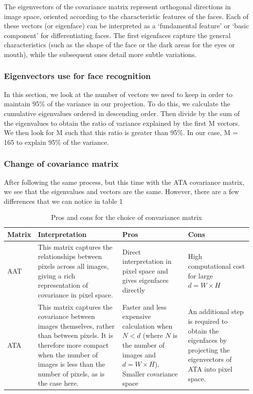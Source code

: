 The eigenvectors of the covariance matrix represent orthogonal directions in image space, oriented according to the characteristic features of the faces. Each of these vectors (or eigenface) can be interpreted as a ‘fundamental feature’ or ‘basic component’ for differentiating faces. The first eigenfaces capture the general characteristics (such as the shape of the face or the dark areas for the eyes or mouth), while the subsequent ones detail more subtle variations.

\subsubsection{Eigenvectors use for face recognition}

In this section, we look at the number of vectors we need to keep in order to maintain 95\% of the variance in our projection. To do this, we calculate the cumulative eigenvalues ordered in descending order. Then divide by the sum of the eigenvalues to obtain the ratio of variance explained by the first M vectors. We then look for M such that this ratio is greater than 95\%. In our case, M = 165 to explain 95\% of the variance.

\subsubsection{Change of covariance matrix}

After following the same process, but this time with the ATA covariance matrix, we see that the eigenvalues and vectors are the same. However, there are a few differences that we can notice in table 1


\begin{table}[ht]
	\centering
	\begin{tabular}{|l|p{7cm}|p{3cm}|p{3cm}|}
		\hline
		\textbf{Matrix} & \textbf{Interpretation} & \textbf{Pros} & \textbf{Cons} \\
		\hline
		AAT & This matrix captures the relationships between pixels across all images, giving a rich representation of covariance in pixel space. & Direct interpretation in pixel space and gives eigenfaces directly & High computational cost for large \( d = W \times H \) \\
		\hline
		ATA & This matrix captures the covariance between images themselves, rather than between pixels. It is therefore more compact when the number of images is less than the number of pixels, as is the case here. & Faster and less expensive calculation when \( N < d \) (where \( N \) is the number of images and \( d = W \times H \)). Smaller covariance space & An additional step is required to obtain the eigenfaces by projecting the eigenvectors of ATA into pixel space. \\
		\hline
	\end{tabular}
	\caption{Pros and cons for the choice of convariance matrix}
	\label{table:matrix_interpretation}
\end{table}


